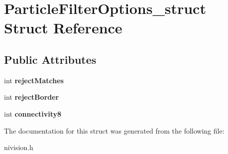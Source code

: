 \hypertarget{structParticleFilterOptions__struct}{\section{\-Particle\-Filter\-Options\-\_\-struct \-Struct \-Reference}
\label{structParticleFilterOptions__struct}
}
\subsection*{\-Public \-Attributes}
\begin{DoxyCompactItemize}
\item 
\hypertarget{structParticleFilterOptions__struct_a2956a16d57d276b2bced58c5e89cb2c6}{int {\bfseries reject\-Matches}}\label{structParticleFilterOptions__struct_a2956a16d57d276b2bced58c5e89cb2c6}

\item 
\hypertarget{structParticleFilterOptions__struct_a614fe41999a0e2759f97e7c516a476a0}{int {\bfseries reject\-Border}}\label{structParticleFilterOptions__struct_a614fe41999a0e2759f97e7c516a476a0}

\item 
\hypertarget{structParticleFilterOptions__struct_a6c57b16dcd2f52ce159c0576108dbddb}{int {\bfseries connectivity8}}\label{structParticleFilterOptions__struct_a6c57b16dcd2f52ce159c0576108dbddb}

\end{DoxyCompactItemize}


\-The documentation for this struct was generated from the following file\-:\begin{DoxyCompactItemize}
\item 
nivision.\-h\end{DoxyCompactItemize}
